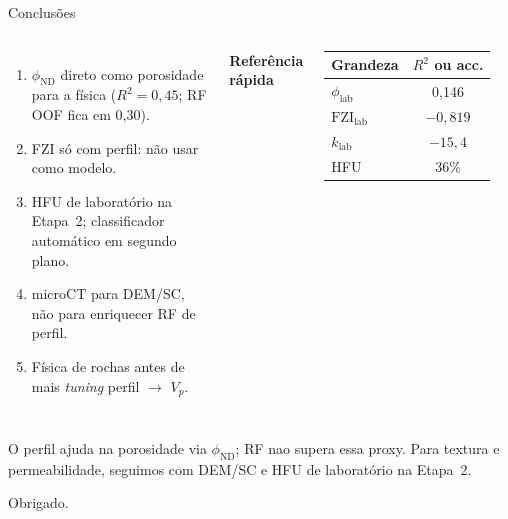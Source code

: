 \documentclass[aspectratio=169,10pt]{beamer}
\newcommand{\philab}{\ensuremath{\phi_{\mathrm{lab}}}}
\newcommand{\fzilab}{\ensuremath{\mathrm{FZI}_{\mathrm{lab}}}}
\newcommand{\klab}{\ensuremath{k_{\mathrm{lab}}}}
\newcommand{\phiND}{\ensuremath{\phi_{\mathrm{ND}}}}
\begin{document}
\begin{frame}{Conclusões}
  \footnotesize
  \begin{columns}[T,onlytextwidth]
    \begin{enumerate}
      \item \phiND{} direto como porosidade para a física ($R^2 = 0{,}45$;
            RF OOF fica em 0,30).
      \item FZI só com perfil: não usar como modelo.
      \item HFU de laboratório na Etapa~2; classificador automático em segundo plano.
      \item microCT para DEM/SC, não para enriquecer RF de perfil.
      \item Física de rochas antes de mais \emph{tuning} perfil $\rightarrow$ $V_p$.
    \end{enumerate}
    \centering
    \textbf{Referência rápida}\\[0.08cm]
    \begin{tabular}{lc}
      \toprule
      Grandeza & $R^2$ ou acc. \\
      \midrule
      \philab & 0,146 \\
      \fzilab & $-0{,}819$ \\
      \klab & $-15{,}4$ \\
      HFU & 36\% \\
      \bottomrule
    \end{tabular}
  \end{columns}
  \vspace{0.12cm}
  \noindent\footnotesize O perfil ajuda na porosidade via \phiND{}; RF nao
  supera essa proxy. Para textura e permeabilidade, seguimos com DEM/SC e HFU
  de laboratório na Etapa~2.
  \vspace{0.15cm}
  \begin{center}
    {\small Obrigado.}
  \end{center}
\end{frame}
\end{document}
